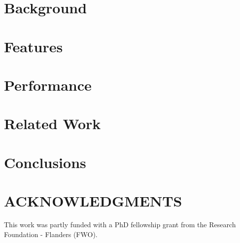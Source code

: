 \documentclass{scs}
\begin{document}
\section{Background}


\section{Features}


\section{Performance}


\section{Related Work}


\section{Conclusions}


\section*{ACKNOWLEDGMENTS}
This work was partly funded with a PhD fellowship grant from the Research Foundation - Flanders (FWO).

\nocite{*}



\end{document}
